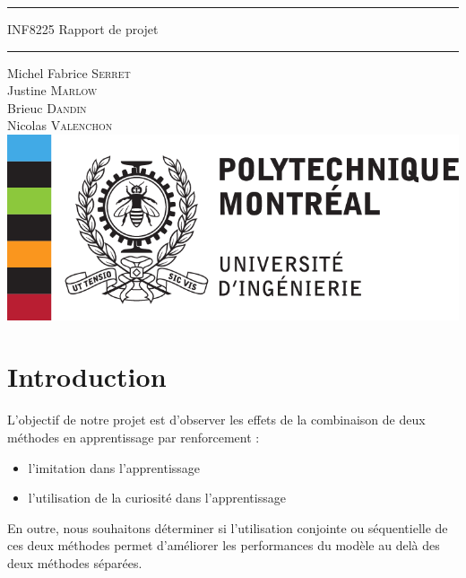 \documentclass[a4paper,12pt]{report}
\begin{document}
\begin{titlepage}

  \begin{center}
  \vspace*{4cm}
    \rule{\linewidth}{0.5pt}
    \bigbreak
    {\Huge {INF8225} }
    \bigbreak
    {\LARGE {Rapport de projet}}
    \medbreak
    \rule{\linewidth}{.5pt}
    \bigbreak
    Michel Fabrice \textsc{Serret}\\
    Justine \textsc{Marlow}\\
    Brieuc \textsc{Dandin}\\
    Nicolas \textsc{Valenchon}\\
    \vfill
	\includegraphics[scale=1]{Logo_Polytechnique_Montréal_(partenariat_Wikimédia).png}
	\vfill

\end{center}
\end{titlepage}

\tableofcontents

\newpage \section*{Introduction}
L'objectif de notre projet est d'observer les effets de la combinaison de deux méthodes en apprentissage par renforcement :
\begin{itemize}
    \item l'imitation dans l'apprentissage
    \item l'utilisation de la curiosité dans l'apprentissage
\end{itemize}
En outre, nous souhaitons déterminer si l'utilisation conjointe ou séquentielle de ces deux méthodes permet d'améliorer les performances du modèle au delà des deux méthodes séparées.\\
\end{document}
